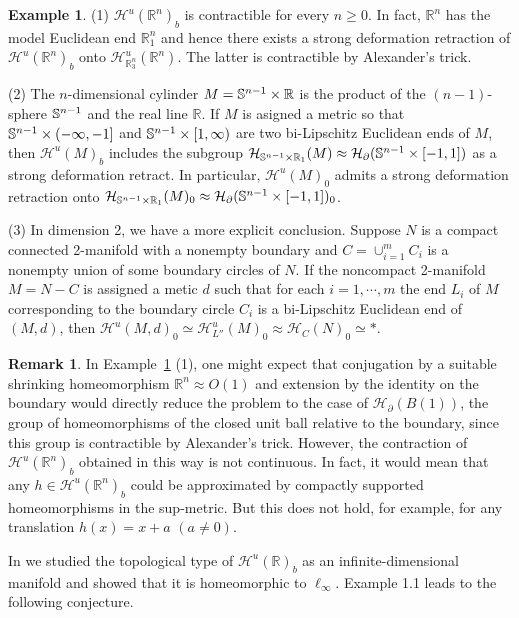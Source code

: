 \documentclass[11pt, fleqn]{amsart}
\theoremstyle{definition}
\newtheorem{remark}{Remark}[section]
\newtheorem{example}{Example}[section]
\newcommand{\cal}{\mathcal}
\newcommand{\IR}{\mathbb R}
\begin{document}
\begin{example}\label{example}
(1) ${\cal H}^u(\IR^n)_b$ is contractible for every $n \geq 0$. 
In fact, $\IR^n$ has the model Euclidean end $\IR^n_1$ and hence 
there exists a strong deformation retraction of ${\cal H}^u(\IR^n)_b$ onto 
${\cal H}^u_{\IR^n_3}(\IR^n)$. 
The latter is contractible by Alexander's trick. 

(2) The $n$-dimensional cylinder $M = {\Bbb S}^{n-1} \times \IR$ is the product of the $(n-1)$-sphere ${\Bbb S}^{n-1}$  and the real line $\IR$. If $M$ is asigned a metric so that ${\Bbb S}^{n-1} \times (-\infty, -1]$ and 
${\Bbb S}^{n-1} \times [1, \infty)$ are two bi-Lipschitz Euclidean ends of $M$, then 
${\cal H}^u(M)_b$ includes the subgroup 
${\cal H}_{{\Bbb S}^{n-1} \times \IR_1}(M) \approx {\cal H}_\partial({\Bbb S}^{n-1} \times [-1,1])$ as a strong deformation retract. 
In particular, ${\cal H}^u(M)_0$ admits a strong deformation retraction onto ${\cal H}_{{\Bbb S}^{n-1} \times \IR_1}(M)_0 \approx {\cal H}_\partial({\Bbb S}^{n-1} \times [-1,1])_0$. 

(3) In dimension 2, we have a more explicit conclusion. Suppose $N$ is a compact connected 2-manifold with a nonempty boundary and $C = \cup_{i=1}^m C_i$ is a nonempty union of some boundary circles of $N$. 
If the noncompact 2-manifold $M = N - C$ is assigned a metic $d$ such that for each $i = 1, \cdots, m$ the end $L_i$ of $M$ corresponding to the boundary circle $C_i$ is a bi-Lipschitz Euclidean end of $(M, d)$, then ${\cal H}^u(M, d)_0 \simeq {\cal H}^u_{L''}(M)_0 \approx {\cal H}_{C}(N)_0 \simeq \ast$. 
\end{example}

\begin{remark} In Example~\ref{example} (1), 
one might expect that conjugation by a suitable shrinking homeomorphism $\IR^n \approx O(1)$ and 
extension by the identity on the boundary would directly reduce the problem to the case of 
${\cal H}_\partial(B(1))$, the group of homeomorphisms of the closed unit ball relative to the boundary, 
since this group is contractible by Alexander's trick. 
However, the contraction of ${\cal H}^u(\IR^n)_b$ obtained in this way is not continuous. 
In fact, 
it would mean that any $h \in {\cal H}^u(\IR^n)_b$ could be approximated by compactly supported homeomorphisms in the sup-metric. 
But this does not hold, for example, for any translation $h(x) = x +a$ $(a \neq 0)$. 
\end{remark} 

In \cite{MSYY} we studied the topological type of ${\cal H}^u(\IR)_b$ as an infinite-dimensional manifold 
and showed that it is homeomorphic to $\ell_\infty$. 
Example 1.1 leads to the following conjecture.  
\end{document}
